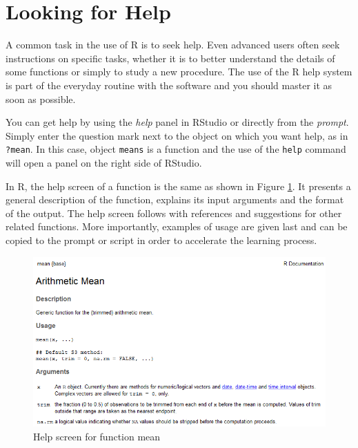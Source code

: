 \documentclass[
  12pt,
]{book}
\begin{document}
\hypertarget{looking-for-help}{%
\section{Looking for Help}\label{looking-for-help}}

A common task in the use of R is to seek help. Even advanced users often seek instructions on specific tasks, whether it is to better understand the details of some functions or simply to study a new procedure. The use of the R help system is part of the everyday routine with the software and you should master it as soon as possible.

You can get help by using the \emph{help} panel in RStudio or directly from the \emph{prompt}. Simply enter the question mark next to the object on which you want help, as in \texttt{?mean}. In this case, object \texttt{means} is a function and the use of the \texttt{help} command will open a panel on the right side of RStudio. 

In R, the help screen of a function is the same as shown in Figure \ref{fig:example-help}. It presents a general description of the function, explains its input arguments and the format of the output. The help screen follows with references and suggestions for other related functions. More importantly, examples of usage are given last and can be copied to the prompt or script in order to accelerate the learning process.

\begin{figure}[!htbp]

{\centering \includegraphics[width=1\linewidth]{figs/ExemploAjuda} 

}

\caption{Help screen for function mean}\label{fig:example-help}
\end{figure}
\end{document}
